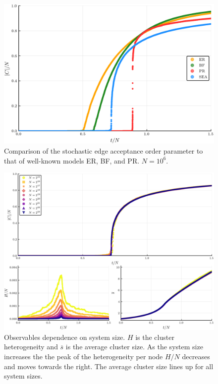 \begin{figure}[H]
	\centering
	\includegraphics[width=350pt, clip]{images/Network_ER_BF_PR_SEA_1e6_order_param.png}
	\caption{Comparison of the stochastic edge acceptance order parameter to that of well-known models ER, BF, and PR. $N = 10^6$.}
	\label{fig:ER_BF_PR_SEA_transition}
\end{figure}

\begin{figure}[H]
	\centering
	\includegraphics[width=350pt, clip]{images/k_scaling_triple.png}
	\caption{Observables dependence on system size. $H$ is the cluster heterogeneity and $\overline{s}$ is the average cluster size. As the system size increases the the peak of the heterogeneity per node $H/N$ decreases and moves towards the right. The average cluster size lines up for all system sizes.}
	\label{fig:k_scaling_triple}
\end{figure}

